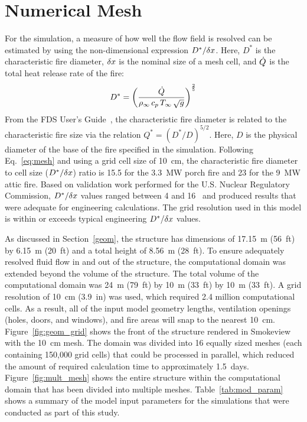 \documentclass[12pt,oneside]{book}
\begin{document}
\section{Numerical Mesh}
\label{mesh}
For the simulation, a measure of how well the flow field is resolved can be estimated by using the non-dimensional expression $D^*/\delta x$. Here, $D^*$ is the characteristic fire diameter, $\delta x$ is the nominal size of a mesh cell, and $\dot{Q}$ is the total heat release rate of the fire:
\begin{equation}
D^* = \left(
     \frac{\dot{Q}}{\rho_\infty \, c_p \, T_\infty \, \sqrt{g}}
     \right)^\frac{2}{5} 
\label{eq:mesh}
\end{equation}   
From the FDS User's Guide~\cite{FDS_Users_Guide}, the characteristic fire diameter is related to the characteristic fire size via the
relation $Q^* = (D^*/D)^{5/2}$. Here, $D$ is the physical diameter of the base of the fire specified in the simulation. Following Eq.~\ref{eq:mesh} and using a grid cell size of 10~cm, the characteristic fire diameter to cell size ($D^*/\delta x$) ratio is 15.5 for the 3.3~MW porch fire and 23 for the 9~MW attic fire. Based on validation work performed for the U.S. Nuclear Regulatory Commission, $D^*/\delta x$ values ranged between 4 and 16~\cite{NUREG_1824} and produced results that were adequate for engineering calculations. The grid resolution used in this model is within or exceeds typical engineering $D^*/\delta x$ values.

As discussed in Section~\ref{geom}, the structure has dimensions of 17.15~m (56~ft) by 6.15~m (20~ft) and a total height of 8.56~m (28~ft). To ensure adequately resolved fluid flow in and out of the structure, the computational domain was extended beyond the volume of the structure. The total volume of the computational domain was 24~m (79~ft) by 10~m (33~ft) by 10~m (33~ft). A grid resolution of 10~cm (3.9~in) was used, which required 2.4 million computational cells. As a result, all of the input model geometry lengths, ventilation openings (holes, doors, and windows), and fire areas will snap to the nearest 10~cm. Figure~\ref{fig:geom_grid} shows the front of the structure rendered in Smokeview with the 10~cm mesh. The domain was divided into 16 equally sized meshes (each containing 150,000 grid cells) that could be processed in parallel, which reduced the amount of required calculation time to approximately 1.5~days. Figure~\ref{fig:mult_mesh} shows the entire structure within the computational domain that has been divided into multiple meshes. Table~\ref{tab:mod_param} shows a summary of the model input parameters for the simulations that were conducted as part of this study.
\end{document}
